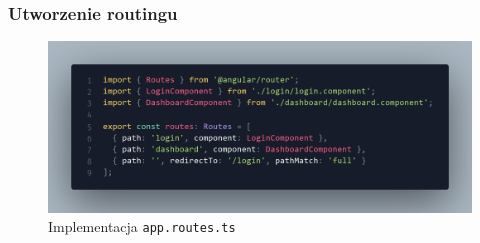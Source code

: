 \documentclass[12pt]{article}
\begin{document}
\subsubsection{Utworzenie routingu}
\begin{figure}[H]
  \centering
  \includegraphics[width=1\textwidth,keepaspectratio]{image-14.png}
  \caption{Implementacja \texttt{app.routes.ts}}
  \label{fig:image-14}
\end{figure}

\pagebreak
\end{document}
